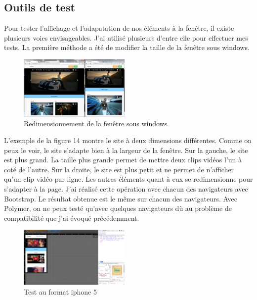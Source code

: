 \documentclass{article}
\begin{document}
\subsection{Outils de test}

\hspace*{0.6cm}Pour tester l'affichage et l'adapatation de nos \'el\'ements \`a la fen\^etre, il existe plusieurs voies envisageables. J'ai utilis\'e plusieurs d'entre elle pour effectuer mes tests. La premi\`ere m\'ethode a \'et\'e de modifier la taille de la fen\^etre sous windows.\\

\begin{figure}
  \vspace{-25pt}
  \begin{center}
    \includegraphics[width=0.48\textwidth]{double}
  \end{center}
  \vspace{-20pt}
  \caption{Redimensionnement de la fen\^etre sous windows}
  \vspace{-10pt}
\end{figure}

L'exemple de la figure 14 montre le site \`a deux dimensions diff\'erentes. Comme on peux le voir, le site s'adapte bien \`a la largeur de la fen\^etre. Sur la gauche, le site est plus grand. La taille plus grande permet de mettre deux clips vid\'eos l'un \`a cot\'e de l'autre. Sur la droite, le site est plus petit et ne permet de n'afficher qu'un clip vid\'eo par ligne. Les autres \'el\'ements quant \`a eux se redimensionne pour s'adapter \`a la page. J'ai r\'ealis\'e cette op\'eration avec chacun des navigateurs avec Bootstrap. Le r\'esultat obtenue est le m\^eme sur chacun des navigateurs. Avec Polymer, on ne peux test\'e qu'avec quelques navigateurs d\`u au probl\`eme de compatibilit\'e que j'ai \'evoqu\'e pr\'ec\'edemment.\\

\begin{figure}
  \vspace{-25pt}
  \begin{center}
    \includegraphics[width=0.48\textwidth]{p16}
  \end{center}
  \vspace{-20pt}
  \caption{Test au format iphone 5}
  \vspace{-10pt}
\end{figure}
\end{document}
